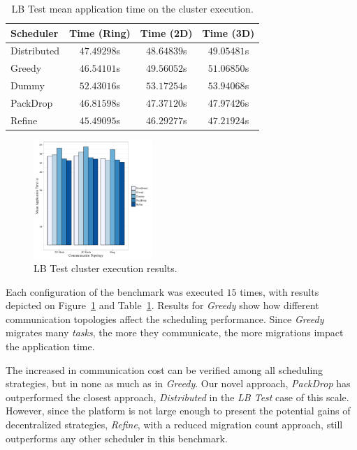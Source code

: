 \begin{table}[t]
	\centering
	\begin{tabular}{l | c | c | c}
    	Scheduler & Time (Ring) & Time (2D) & Time (3D) \\ \hline
        Distributed & $47.49298$s & $48.64839$s & $49.05481$s \\
        Greedy & $46.54101$s & $49.56052$s & $51.06850$s \\
        Dummy & $52.43016$s & $53.17254$s & $53.94068$s \\
        PackDrop & $46.81598$s & $47.37120$s & $47.97426$s \\
        Refine & $45.49095$s & $46.29277$s & $47.21924$s \\		
	\end{tabular}
    \caption{LB Test mean application time on the cluster execution.}
    \label{tab:lbtest:apptime}
\end{table}

\begin{figure}
	\centering
    \includegraphics[width=0.4\textwidth]{images/apptime_lbtest_g5k.pdf}
    \caption{LB Test cluster execution results.}
    \label{fig:eval:g5k:lbtest:apptime}
\end{figure}


Each configuration of the benchmark was executed $15$ times, with results depicted on Figure~\ref{fig:eval:g5k:lbtest:apptime} and Table~\ref{tab:lbtest:apptime}.
Results for \textit{Greedy} show how different communication topologies affect the scheduling performance.
Since \textit{Greedy} migrates many \textit{tasks}, the more they communicate, the more migrations impact the application time.

The increased in communication cost can be verified among all scheduling strategies, but in none as much as in \textit{Greedy}.
Our novel approach, \textit{PackDrop} has outperformed the closest approach, \textit{Distributed} in the \textit{LB Test} case of this scale.
However, since the platform is not large enough to present the potential gains of decentralized strategies, \textit{Refine}, with a reduced migration count approach, still outperforms any other scheduler in this benchmark.

